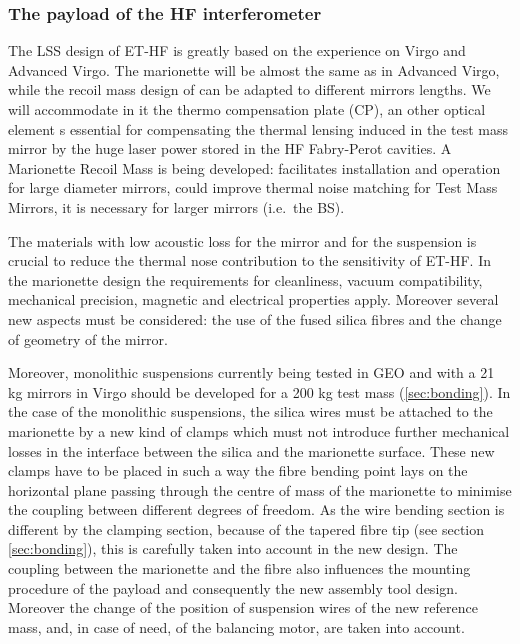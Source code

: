 \FloatBarrier
\subsubsection{The payload of the HF interferometer}
\label{sec:HF-interferometer}



The LSS design of ET-HF  is greatly based on the experience on Virgo and Advanced Virgo.  The  marionette will be almost the same as in Advanced Virgo, while the  recoil mass design of can be adapted to different mirrors lengths. We will   accommodate in it the  thermo  compensation plate (CP),  an other optical element  s essential for compensating the thermal lensing induced in the test mass mirror by the huge laser power stored in the HF Fabry-Perot cavities. 
A Marionette Recoil Mass is being developed: facilitates installation and operation for large diameter mirrors, could improve thermal noise matching for Test Mass Mirrors, it is necessary for larger mirrors (i.e.\ the BS). 

The materials with low acoustic loss for the mirror and for the suspension is crucial to reduce the thermal nose contribution to the sensitivity of ET-HF. 
In the marionette design the requirements for cleanliness, vacuum compatibility, mechanical precision, magnetic and electrical properties apply. Moreover several new aspects must be considered: the use of the fused silica fibres and the change of geometry of the mirror. 


Moreover, monolithic suspensions currently being tested in GEO and with a 21 kg mirrors in Virgo should be developed for a 200 kg test mass (\ref{sec:bonding}).
In the case of the monolithic suspensions, the silica wires must be attached to the marionette by a new kind of clamps which must not introduce further mechanical losses in the interface between the silica and the marionette surface. 
These new clamps have to be placed in such a way the fibre bending point lays on the horizontal plane passing through the centre of mass of the marionette to minimise the coupling between different degrees of freedom. As the wire bending section is different by the clamping section, because of the tapered fibre tip (see section \ref{sec:bonding}), this is carefully taken into account in the new design. 
The coupling between the marionette and the fibre also influences the mounting procedure of the payload and consequently the new assembly tool design. Moreover the change of the position of suspension wires of the new reference mass, and, in case of need, of the balancing motor, are taken into account. 

